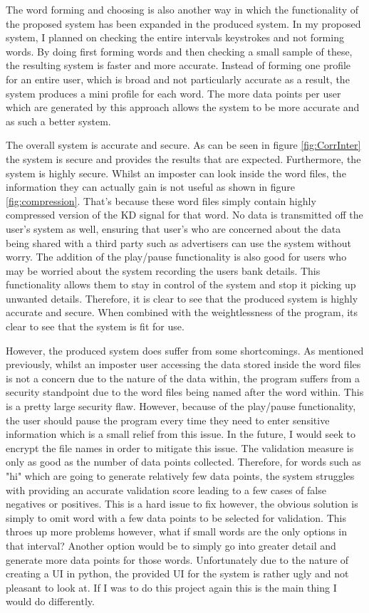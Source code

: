 \documentclass[10pt,a4paper]{report}
\begin{document}
The word forming and choosing is also another way in which the functionality of the proposed system has been expanded in the produced system. In my proposed system, I planned on checking the entire intervals keystrokes and not forming words. By doing first forming words and then checking a small sample of these, the resulting system is faster and more accurate. Instead of forming one profile for an entire user, which is broad and not particularly accurate as a result, the system produces a mini profile for each word. The more data points per user which are generated by this approach allows the system to be more accurate and as such a better system. 

The overall system is accurate and secure. As can be seen in figure \ref{fig:CorrInter} the system is secure and provides the results that are expected. Furthermore, the system is highly secure. Whilst an imposter can look inside the word files, the information they can actually gain is not useful as shown in figure \ref{fig:compression}. That's because these word files simply contain highly compressed version of the KD signal for that word. No data is transmitted off the user's system as well, ensuring that user's who are concerned about the data being shared with a third party such as advertisers can use the system without worry. The addition of the play/pause functionality is also good for users who may be worried about the system recording the users bank details. This functionality allows them to stay in control of the system and stop it picking up unwanted details. Therefore, it is clear to see that the produced system is highly accurate and secure. When combined with the weightlessness of the program, its clear to see that the system is fit for use.

However, the produced system does suffer from some shortcomings. As mentioned previously, whilst an imposter user accessing the data stored inside the word files is not a concern due to the nature of the data within, the program suffers from a security standpoint due to the word files being named after the word within. This is a pretty large security flaw. However, because of the play/pause functionality, the user should pause the program every time they need to enter sensitive information which is a small relief from this issue. In the future, I would seek to encrypt the file names in order to mitigate this issue. The validation measure is only as good as the number of data points collected. Therefore, for words such as "hi" which are going to generate relatively few data points, the system struggles with providing an accurate validation score leading to a few cases of false negatives or positives. This is a hard issue to fix however, the obvious solution is simply to omit word with a few data points to be selected for validation. This throes up more problems however, what if small words are the only options in that interval? Another option would be to simply go into greater detail and generate more data points for those words. Unfortunately due to the nature of creating a UI in python, the provided UI for the system is rather ugly and not pleasant to look at. If I was to do this project again this is the main thing I would do differently.
\end{document}
